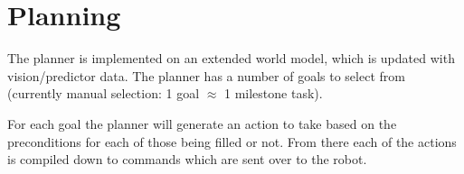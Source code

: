 \section{Planning}

The planner is implemented on an extended world model, which is updated with vision/predictor data.
The planner has a number of goals to select from (currently manual selection: 1 goal $\approx$ 1 milestone task). 
 
For each goal the planner will generate an action to take based on the preconditions for each of those being filled or not. From there each of the actions is compiled down to commands which are sent over to the robot.